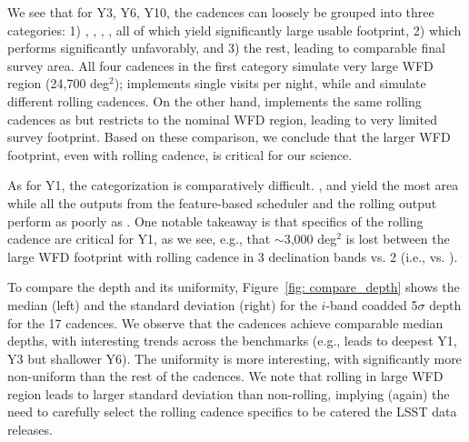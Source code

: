 We see that for Y3, Y6, Y10, the cadences can loosely be grouped into three categories: 1) , , , , all of which yield significantly large usable footprint, 2)  which performs significantly unfavorably, and 3) the rest, leading to comparable final survey area.  All four cadences in the first category simulate very large WFD region (24,700 deg$^2$);  implements single visits per night, while  and  simulate different rolling cadences. On the other hand,  implements the same rolling cadences as   but restricts to the nominal WFD region, leading to very limited survey footprint. Based on these comparison, we conclude that the larger WFD footprint, even with rolling cadence, is critical for our science.

As for Y1, the categorization is comparatively difficult.  ,  and  yield the most area while all the outputs from the feature-based scheduler and the rolling   output perform as poorly as . One notable takeaway is that specifics of the rolling cadence are critical for Y1, as we see, e.g., that $\sim$3,000 deg$^2$ is lost between the large WFD footprint with rolling cadence in 3 declination bands vs. 2 (i.e.,  vs. ).

To compare the depth and its uniformity, Figure~\ref{fig: compare_depth} shows the median (left) and the standard deviation (right) for the $i$-band coadded 5$\sigma$ depth for the 17 cadences. We observe that the cadences achieve comparable median depths, with interesting trends across the benchmarks  (e.g.,  leads to deepest Y1, Y3 but shallower Y6). The uniformity is more interesting, with  significantly more non-uniform than the rest of the cadences. We note that rolling in large WFD region leads to larger standard deviation than non-rolling, implying (again) the need to carefully select the rolling cadence specifics to be catered the LSST data releases.

